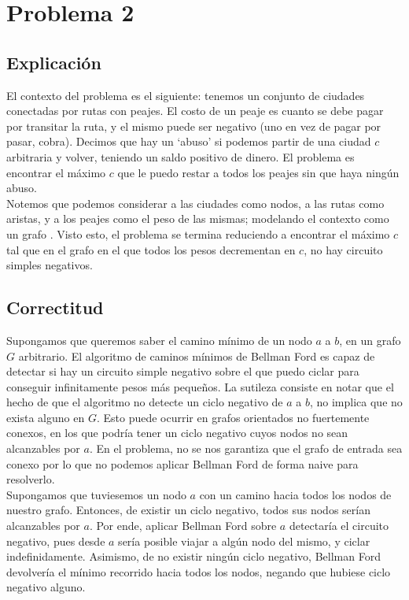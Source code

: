 
\section{Problema 2}

\subsection{Explicación}

El contexto del problema es el siguiente: tenemos un conjunto de ciudades conectadas por rutas con peajes. El costo de un peaje es cuanto se debe pagar por transitar la ruta, y el mismo puede ser negativo (uno en vez de pagar por pasar, cobra). Decimos que hay un `abuso' si podemos partir de una ciudad $c$ arbitraria y volver, teniendo un saldo positivo de dinero. El problema es encontrar el máximo $c$ que le puedo restar a todos los peajes sin que haya ningún abuso. \\

Notemos que podemos considerar a las ciudades como nodos, a las rutas como aristas, y a los peajes como el peso de las mismas; modelando el contexto como un grafo . Visto esto, el problema se termina reduciendo a encontrar el máximo $c$ tal que en el grafo en el que todos los pesos decrementan en $c$, no hay circuito simples negativos. \\

\subsection{Correctitud}

Supongamos que queremos saber el camino mínimo de un nodo $a$ a $b$, en un grafo $G$ arbitrario. El algoritmo de caminos mínimos de Bellman Ford es capaz de detectar si hay un circuito simple negativo sobre el que puedo ciclar para conseguir infinitamente pesos más pequeños. La sutileza consiste en notar que el hecho de que el algoritmo no detecte un ciclo negativo de $a$ a $b$, no implica que no exista alguno en $G$. Esto puede ocurrir en grafos orientados no fuertemente conexos, en los que podría tener un ciclo negativo cuyos nodos no sean alcanzables por $a$. En el problema, no se nos garantiza que el grafo de entrada sea conexo por lo que no podemos aplicar Bellman Ford de forma naive para resolverlo. \\

Supongamos que tuviesemos un nodo $a$ con un camino hacia todos los nodos de nuestro grafo. Entonces, de existir un ciclo negativo, todos sus nodos serían alcanzables por $a$. Por ende, aplicar Bellman Ford sobre $a$ detectaría el circuito negativo, pues desde $a$ sería posible viajar a algún nodo del mismo, y ciclar indefinidamente. Asimismo, de no existir ningún ciclo negativo, Bellman Ford devolvería el mínimo recorrido hacia todos los nodos, negando que hubiese ciclo negativo alguno. \\

